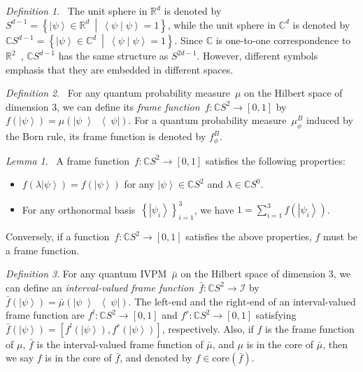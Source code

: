 \documentclass{article}
\theoremstyle{remark}
\newtheorem{definition}{Definition}
\newtheorem{lemma}{Lemma}
\newcommand{\ket}[1]{{\left\vert{#1}\right\rangle}}
\newcommand{\op}[2]{\ensuremath{\left\vert{#1}\middle\rangle\middle\langle{#2}\right\vert}}
\newcommand{\proj}[1]{\op{#1}{#1}}
\newcommand{\ip}[2]{\ensuremath{\left\langle{#1}\middle\vert{#2}\right\rangle}}
\newcommand{\set}[2]{\ensuremath{\left\{ {#1}~\middle|~{#2}\right\} }}
\begin{document}
\begin{definition}\cite{Hatcher2001,dryden2005}~The unit sphere
in $\mathbb{R}^{d}$ is denoted by $S^{d-1}=\set{\ket{\psi}\in\mathbb{R}^{d}}{\ip{\psi}{\psi}=1}$,
while the unit sphere in $\mathbb{C}^{d}$ is denoted by $\mathbb{C}S^{d-1}=\set{\ket{\psi}\in\mathbb{C}^{d}}{\ip{\psi}{\psi}=1}$.
Since $\mathbb{C}$ is one-to-one correspondence to $\mathbb{R}^{2}$~\cite{GAMELIN2003},
$\mathbb{C}S^{d-1}$ has the same structure as $S^{2d-1}$. However,
different symbols emphasis that they are embedded in different spaces.\end{definition}

\begin{definition}\cite{gleason1957,CookeKeaneMoran1985,peres1995quantum,RichmanBridges1999,Hamhalter2013}~For
any quantum probability measure~$\mu$ on the Hilbert space of dimension
3, we can define its \emph{frame function}~$f:\mathbb{C}S^{2}\rightarrow\left[0,1\right]$
by $f\left(\ket{\psi}\right)=\mu\left(\proj{\psi}\right)$. For a
quantum probability measure~$\mu_{\phi}^{B}$ induced by the Born
rule, its frame function is denoted by $f_{\phi}^{B}$.\end{definition}

\begin{lemma}\cite{gleason1957,CookeKeaneMoran1985,peres1995quantum,RichmanBridges1999,Hamhalter2013}~A
frame function~$f:\mathbb{C}S^{2}\rightarrow\left[0,1\right]$ satisfies
the following properties:
\begin{itemize}
\item $f\left(\lambda\ket{\psi}\right)=f\left(\ket{\psi}\right)$ for any
$\ket{\psi}\in\mathbb{C}S^{2}$ and $\lambda\in\mathbb{C}S^{0}$.
\item For any orthonormal basis~$\left\{ \ket{\psi_{i}}\right\} _{i=1}^{3}$,
we have $1=\sum_{i=1}^{3}f\left(\ket{\psi_{i}}\right)$.
\end{itemize}
Conversely, if a function~$f:\mathbb{C}S^{2}\rightarrow\left[0,1\right]$
satisfies the above properties, $f$ must be a frame function.\end{lemma}

\begin{definition}For any quantum IVPM~$\bar{\mu}$ on the Hilbert
space of dimension 3, we can define an \emph{interval-valued frame
function}~$\bar{f}:\mathbb{C}S^{2}\rightarrow\mathscr{I}$ by $\bar{f}\left(\ket{\psi}\right)=\bar{\mu}\left(\proj{\psi}\right)$.
The left-end and the right-end of an interval-valued frame function
are $f^{l}:\mathbb{C}S^{2}\rightarrow\left[0,1\right]$ and $f^{r}:\mathbb{C}S^{2}\rightarrow\left[0,1\right]$
satisfying $\bar{f}\left(\ket{\psi}\right)=\left[f^{l}\left(\ket{\psi}\right),f^{r}\left(\ket{\psi}\right)\right]$,
respectively. Also, if $f$ is the frame function of $\mu$, $\bar{f}$
is the interval-valued frame function of $\bar{\mu}$, and $\mu$
is in the core of $\bar{\mu}$, then we say $f$ is in the core of
$\bar{f}$, and denoted by $f\in\mathrm{core}\left(\bar{f}\right)$.\end{definition}
\end{document}
